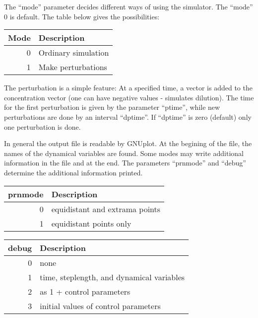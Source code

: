 The ``mode'' parameter decides different ways of using the simulator.
The ``mode'' 0 is default. The table below gives the possibilities:

\begin{center}
  \begin{tabular}{rl}
    Mode  & Description \\ \hline
    0     & Ordinary simulation \\
    1     & Make perturbations \\
    \hline
  \end{tabular}
\end{center}

The perturbation is a simple feature: At a specified time, a vector is
added to the concentration vector (one can have negative values -
simulates dilution). The time for the first perturbation is given by
the parameter ``ptime'', while new perturbations are done by an
interval ``dptime''. If ``dptime'' is zero (default) only one
perturbation is done.

In general the output file is readable by GNUplot. At the begining of
the file, the names of the dynamical variables are found. Some modes
may write additional information in the file and at the end. The
parameters ``prnmode'' and ``debug'' determine the additional
information printed.

\begin{center}
  \begin{tabular}{rl}
    prnmode   & Description \\ \hline
     0        & equidistant and extrama points \\
     1        & equidistant points only \\
   \hline
   \end{tabular}
\end{center}


\begin{center}
  \begin{tabular}{rl}
    debug   & Description \\ \hline
     0      & none \\
     1      & time, steplength, and dynamical variables \\
     2      & as 1 + control parameters \\
     3      & initial values of control parameters \\
   \hline
   \end{tabular}
\end{center}


